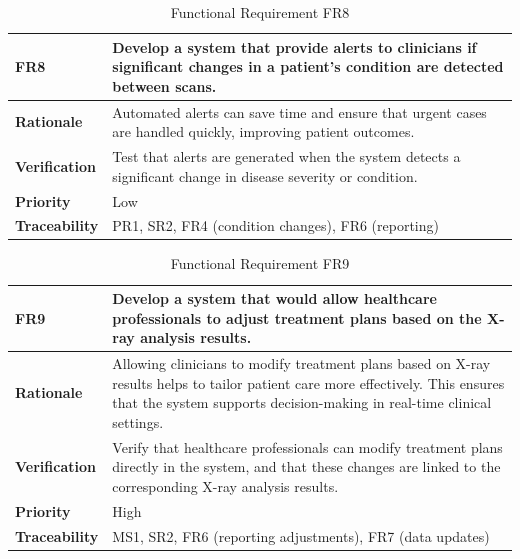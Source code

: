 \documentclass[12pt]{article}
\begin{document}
\begin{table}[h!]
\centering
{}
\begin{tabular}{|p{3.5cm}|p{11.5cm}|}
\hline
\rowcolor{gray!30}
\textbf{FR8} & Develop a system that provide alerts to clinicians if significant changes in a patient's condition are detected between scans. \\
\hline
\textbf{Rationale} & Automated alerts can save time and ensure that urgent cases are handled quickly, improving patient outcomes. \\
\hline
\textbf{Verification} & Test that alerts are generated when the system detects a significant change in disease severity or condition. \\
\hline
\textbf{Priority} & Low \\
\hline
\textbf{Traceability} & PR1, SR2, FR4 (condition changes), FR6 (reporting) \\
\hline
\end{tabular}
\caption{Functional Requirement FR8}
\end{table}
\begin{table}[h!]
  \centering
  \begin{tabular}{|p{3.5cm}|p{11.5cm}|}
  \hline
  \rowcolor{gray!30}
  \textbf{FR9} & Develop a system that would allow healthcare professionals to adjust treatment plans based on the X-ray analysis results. \\
  \hline
  \textbf{Rationale} & Allowing clinicians to modify treatment plans based on X-ray results helps to tailor patient care more effectively. This ensures that the system supports decision-making in real-time clinical settings. \\
  \hline
  \textbf{Verification} & Verify that healthcare professionals can modify treatment plans directly in the system, and that these changes are linked to the corresponding X-ray analysis results. \\
  \hline
  \textbf{Priority} & High \\
  \hline
  \textbf{Traceability} & MS1, SR2, FR6 (reporting adjustments), FR7 (data updates) \\
  \hline
  \end{tabular}
  \caption{Functional Requirement FR9}
  \end{table}
\end{document}
